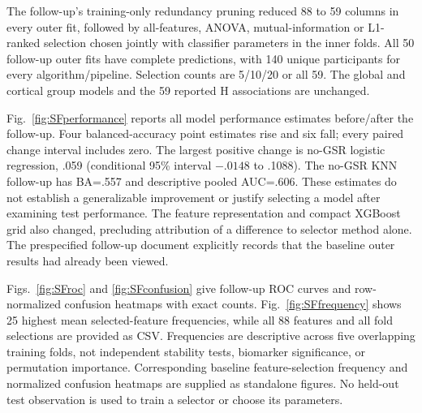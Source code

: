 \documentclass[10pt,letterpaper]{article}
\begin{document}
The follow-up's training-only redundancy pruning reduced 88 to 59 columns in
every outer fit, followed by all-features, ANOVA, mutual-information or L1-ranked
selection chosen jointly with classifier parameters in the inner folds. All
50 follow-up outer fits have complete predictions, with 140 unique participants
for every algorithm/pipeline. Selection counts are 5/10/20 or all 59. The global
and cortical group models and the 59 reported H associations are unchanged.

Fig.~\ref{fig:SFperformance} reports all model performance estimates before/after
the follow-up. Four balanced-accuracy point estimates rise and six fall; every
paired change interval includes zero. The largest positive change is no-GSR
logistic regression, .059 (conditional 95\% interval $-.0148$ to .1088).
The no-GSR KNN follow-up has BA=.557 and descriptive pooled AUC=.606.
These estimates do not establish a generalizable improvement or justify selecting
a model after examining test performance. The feature representation and compact
XGBoost grid also changed, precluding attribution of a difference to selector
method alone. The prespecified follow-up document explicitly records that the
baseline outer results had already been viewed.

Figs.~\ref{fig:SFroc} and \ref{fig:SFconfusion} give follow-up ROC curves and
row-normalized confusion heatmaps with exact counts. Fig.~\ref{fig:SFfrequency}
shows 25 highest mean selected-feature frequencies, while all 88 features and
all fold selections are provided as CSV. Frequencies are descriptive across
five overlapping training folds, not independent stability tests, biomarker
significance, or permutation importance. Corresponding baseline feature-selection
frequency and normalized confusion heatmaps are supplied as standalone figures.
No held-out test observation is used to train a selector or choose its parameters.
\end{document}
